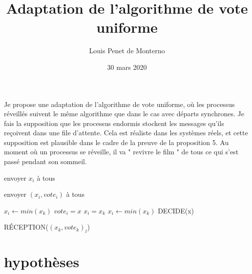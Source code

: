 \documentclass{article}
\title{Adaptation de l'algorithme de vote uniforme}
\date{30 mars 2020}
\author{Louis Penet de Monterno}
\begin{document}
  \maketitle

  Je propose une adaptation de l'algorithme de vote uniforme, où les processus réveillés suivent le même algorithme que dans le cas avec départs synchrones. Je fais la supposition que les processus endormis stockent les messages qu'ils reçoivent dans une file d'attente. Cela est réaliste dans les systèmes réels, et cette supposition est plausible dans le cadre de la preuve de la proposition 5. Au moment où un processus se réveille, il va " revivre le film " de tous ce qui s'est passé pendant son sommeil. 

  \begin{algorithmic}

			  envoyer $x_i$ à tous
		  \Else

			  envoyer $(x_i, vote_i)$ à tous

		  \EndIf
	  \EndFunction
  \end{algorithmic}

  \begin{algorithmic}

			  \State $x_i \gets min(x_k)$
				  \State $vote_i = x$
			  \EndIf
		  \Else
				  \State $x_i = x_k$
			  \Else
				  \State $x_i \gets min(x_k)$
			  \EndIf
				  \State DECIDE(x)
			  \EndIf
		  \EndIf
	  \EndFunction

  \end{algorithmic}

  \begin{algorithmic}
			  \State RÉCEPTION($(x_k, vote_k)_l$)
		  \EndFor
	  \EndFunction
	  
  \end{algorithmic}

\section{hypothèses}
\end{document}
